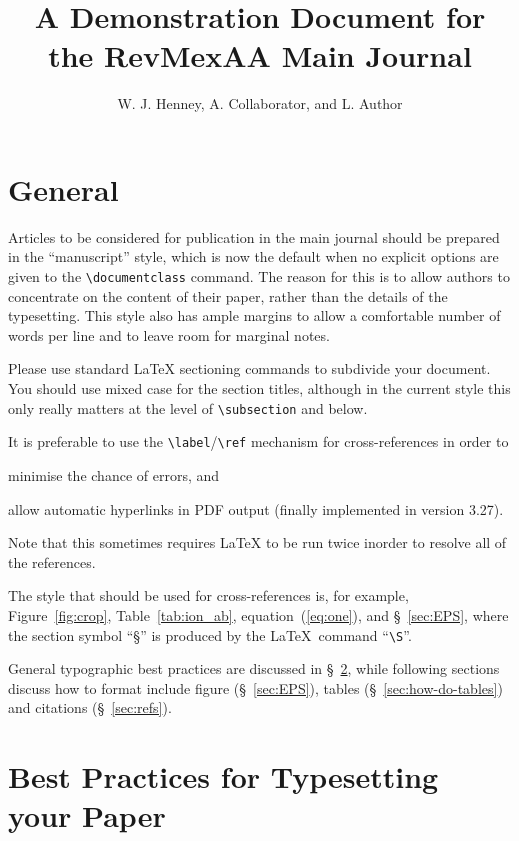 \documentclass[debug]{rmxaa}
\title{A Demonstration Document for the RevMexAA Main Journal}
\author{
  W. J. Henney\ORCIDiD{0000-0001-6208-9109},\altaffilmark{1} 
  A. Collaborator,\altaffilmark{2}
  and L. Author\altaffilmark{2,3,4}}
\newcommand{\CS}[1]{\texttt{\textbackslash #1}}
\begin{document}
\maketitle


\section{General}
\label{sec:intro}

Articles to be considered for publication in the main journal should
be prepared in the ``manuscript'' style, which is now the default when
no explicit options are given to the \CS{documentclass} command. The
reason for this is to allow authors to concentrate on the content of
their paper, rather than the details of the typesetting. This style
also has ample margins to allow a comfortable number of words per line
and to leave room for marginal notes.

Please use standard \LaTeX{} sectioning commands to subdivide your
document. You should use mixed case for the section titles, although
in the current style this only really matters at the level of
\CS{subsection} and below.

It is preferable to use the \CS{label}/\CS{ref} mechanism for
cross-references in order to
\begin{inparaenum}[(1)]
\item minimise the chance of errors, and 
\item allow automatic hyperlinks in PDF output (finally implemented in
  version 3.27).
\end{inparaenum}
Note that this sometimes requires \LaTeX{} to be run twice inorder to
resolve all of the references.

The style that should be used for cross-references is, for example,
Figure~\ref{fig:crop}, Table~\ref{tab:ion_ab},
equation~(\ref{eq:one}), and \S~\ref{sec:EPS}, where the section
symbol ``\S'' is produced by the \LaTeX\ command ``\CS{S}''.

General typographic best practices are discussed in
\S~\ref{sec:errors}, while following sections discuss how to format
include figure (\S~\ref{sec:EPS}), tables (\S~\ref{sec:how-do-tables})
and citations (\S~\ref{sec:refs}).

\section{Best Practices for Typesetting your Paper}
\label{sec:errors}
\end{document}
